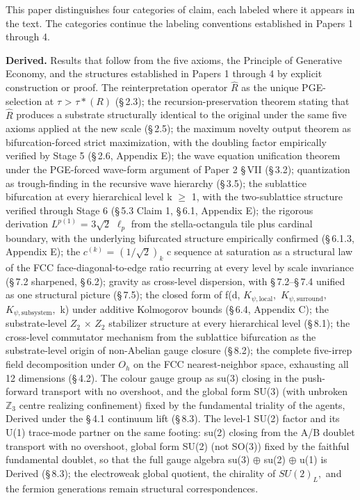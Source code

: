 \documentclass[11pt,oneside]{report}
\theoremstyle{definition}
\theoremstyle{remark}
\begin{document}
This paper distinguishes four categories of claim, each labeled where it
appears in the text. The categories continue the labeling conventions
established in Papers 1 through 4.

\textbf{Derived.} Results that follow from the five axioms, the
Principle of Generative Economy, and the structures established in
Papers 1 through 4 by explicit construction or proof. The
reinterpretation operator \ensuremath{\hat{R}} as the unique PGE-selection at \ensuremath{\tau}
\textgreater{} \ensuremath{\tau *(R)} (\S\,2.3); the recursion-preservation theorem stating
that \ensuremath{\hat{R}} produces a substrate structurally identical to the original under
the same five axioms applied at the new scale (\S\,2.5); the maximum
novelty output theorem as bifurcation-forced strict maximization, with
the doubling factor empirically verified by Stage 5 (\S\,2.6, Appendix E);
the wave equation unification theorem under the PGE-forced wave-form
argument of Paper 2 \S\,VII (\S\,3.2); quantization as trough-finding in the
recursive wave hierarchy (\S\,3.5); the sublattice bifurcation at every
hierarchical level k \ensuremath{\geq} 1, with the two-sublattice structure verified
through Stage 6 (\S\,5.3 Claim 1, \S\,6.1, Appendix E); the rigorous
derivation \ensuremath{L^{p(1)}} = \ensuremath{3\sqrt{2}} \ensuremath{\ell_{p}} from the stella-octangula tile plus cardinal
boundary, with the underlying bifurcated structure empirically confirmed
(\S\,6.1.3, Appendix E); the \ensuremath{c^{(k)}} = \ensuremath{(1/\sqrt{2})_{k}} c sequence at saturation as a
structural law of the FCC face-diagonal-to-edge ratio recurring at every
level by scale invariance (\S\,7.2 sharpened, \S\,6.2); gravity as cross-level
dispersion, with \S\,7.2--\S\,7.4 unified as one structural picture (\S\,7.5);
the closed form of f(d, \ensuremath{K_{\psi,\mathrm{local}},} \ensuremath{K_{\psi,\mathrm{surround}},} \ensuremath{K_{\psi,\mathrm{subsystem}},} k)
under additive Kolmogorov bounds (\S\,6.4, Appendix C); the substrate-level
\ensuremath{Z_{2}} \ensuremath{\times} \ensuremath{Z_{2}} stabilizer structure at every hierarchical level (\S\,8.1); the
cross-level commutator mechanism from the sublattice bifurcation as the
substrate-level origin of non-Abelian gauge closure (\S\,8.2); the complete
five-irrep field decomposition under \ensuremath{O_{h}} on the FCC nearest-neighbor
space, exhausting all 12 dimensions (\S\,4.2). The colour gauge group as
su(3) closing in the push-forward transport with no overshoot, and the
global form SU(3) (with unbroken \ensuremath{\mathbb{Z}_{3}} centre realizing confinement) fixed
by the fundamental triality of the agents, Derived under the \S\,4.1
continuum lift (\S\,8.3). The level-1 SU(2) factor and its U(1) trace-mode
partner on the same footing: su(2) closing from the A/B doublet
transport with no overshoot, global form SU(2) (not SO(3)) fixed by the
faithful fundamental doublet, so that the full gauge algebra su(3) \ensuremath{\oplus}
su(2) \ensuremath{\oplus} u(1) is Derived (\S\,8.3); the electroweak global quotient, the
chirality of \ensuremath{SU(2)_{L},} and the fermion generations remain structural
correspondences.
\end{document}
